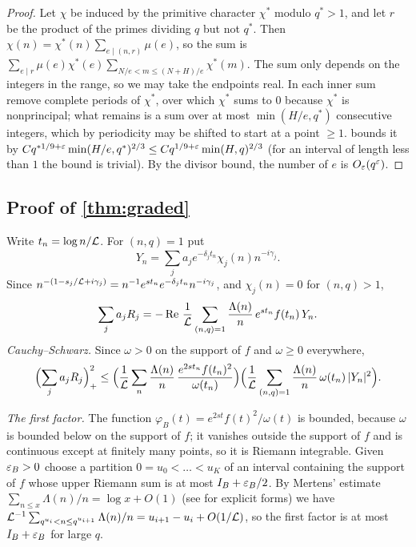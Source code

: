 \begin{proof}
Let $\chi$ be induced by the primitive character $\chi^*$ modulo $q^*>1$, and let $r$ be the product
of the primes dividing $q$ but not $q^*$. Then $\chi(n)=\chi^*(n)\sum_{e\mid(n,r)}\mu(e)$, so the sum
is $\sum_{e\mid r}\mu(e)\chi^*(e)\sum_{N/e<m\le(N+H)/e}\chi^*(m)$. The sum only depends on the integers
in the range, so we may take the endpoints real. In each inner sum remove complete periods of
$\chi^*$, over which $\chi^*$ sums to $0$ because $\chi^*$ is nonprincipal; what remains is a sum over at
most $\min(H/e,q^*)$ consecutive integers, which by periodicity may be shifted to start at a point
$\ge1$.  bounds it by $Cq^{*1/9+\varepsilon}\min(H/e,q^*)^{2/3}\le Cq^{1/9+\varepsilon}\min(H,q)^{2/3}$
(for an interval of length less than $1$ the bound is trivial). By the divisor bound, the number
of $e$ is $O_\varepsilon(q^\varepsilon)$.
\end{proof}

\subsection{Proof of \texorpdfstring{\cref{thm:graded}}{the theorem}}
Write $t_n=\log n/\mathcal{L}$. For $(n,q)=1$ put
\[
  Y_n=\sum_ja_je^{-\delta_jt_n}\chi_j(n)n^{-i\gamma_j}.
\]
Since $n^{-(1-s_j/\mathcal{L}+i\gamma_j)}=n^{-1}e^{st_n}e^{-\delta_jt_n}n^{-i\gamma_j}$, and $\chi_j(n)=0$
for $(n,q)>1$,
\[
  \sum_ja_jR_j=-\operatorname{Re}\,\frac1{\mathcal{L}}\sum_{(n,q)=1}\frac{\Lambda(n)}n\,e^{st_n}f(t_n)\,Y_n .
\]
\emph{Cauchy--Schwarz.} Since $\omega>0$ on the support of $f$ and $\omega\ge0$ everywhere,
\begin{equation}\label{eq:CS}
  \Bigl(\sum_ja_jR_j\Bigr)_+^2\le
  \Bigl(\frac1{\mathcal{L}}\sum_n\frac{\Lambda(n)}n\,\frac{e^{2st_n}f(t_n)^2}{\omega(t_n)}\Bigr)
  \Bigl(\frac1{\mathcal{L}}\sum_{(n,q)=1}\frac{\Lambda(n)}n\,\omega(t_n)\,|Y_n|^2\Bigr).
\end{equation}

\emph{The first factor.} The function $\varphi_B(t)=e^{2st}f(t)^2/\omega(t)$ is bounded, because
$\omega$ is bounded below on the support of $f$; it vanishes outside the support of $f$ and is
continuous except at finitely many points, so it is Riemann integrable. Given $\varepsilon_B>0$ choose a
partition $0=u_0<\dots<u_K$ of an interval containing the support of $f$ whose upper Riemann
sum is at most $I_B+\varepsilon_B/2$. By Mertens' estimate $\sum_{n\le x}\Lambda(n)/n=\log x+O(1)$ (see \cite{RosserSchoenfeld1962approximate}
for explicit forms) we have
$\mathcal{L}^{-1}\sum_{q^{u_i}<n\le q^{u_{i+1}}}\Lambda(n)/n=u_{i+1}-u_i+O(1/\mathcal{L})$, so the first factor is at most
$I_B+\varepsilon_B$ for large $q$.

